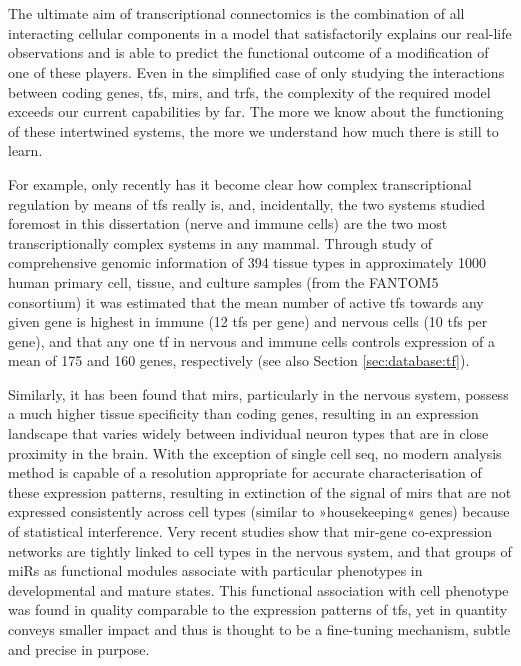 \section[Nested Multimodal Transcriptional Interactions - The Need for Connectomics]{}
The ultimate aim of transcriptional connectomics is the combination of all interacting cellular components in a model that satisfactorily explains our real-life observations and is able to predict the functional outcome of a modification of one of these players. Even in the simplified case of only studying the interactions between coding genes, \acp{tf}, \acp{mir}, and \acp{trf}, the complexity of the required model exceeds our current capabilities by far. The more we know about the functioning of these intertwined systems, the more we understand how much there is still to learn. 

For example, only recently has it become clear how complex transcriptional regulation by means of \acp{tf} really is, and, incidentally, the two systems studied foremost in this dissertation (nerve and immune cells) are the two most transcriptionally complex systems in any mammal. Through study of comprehensive genomic information of 394 tissue types in approximately 1000 human primary cell, tissue, and culture samples (from the FANTOM5 consortium) it was estimated that the mean number of active \acp{tf} towards any given gene is highest in immune (12 \acp{tf} per gene) and nervous cells (10 \acp{tf} per gene), and that any one \ac{tf} in nervous and immune cells controls expression of a mean of 175 and 160 genes, respectively\cite{Marbach2016} (see also Section \ref{sec:database:tf}). 

Similarly, it has been found that \acp{mir}, particularly in the nervous system, possess a much higher tissue specificity than coding genes, resulting in an expression landscape that varies widely between individual neuron types that are in close proximity in the brain. With the exception of single cell \ac{seq}, no modern analysis method is capable of a resolution appropriate for accurate characterisation of these expression patterns, resulting in extinction of the signal of \acp{mir} that are not expressed consistently across cell types (similar to »housekeeping« genes) because of statistical interference. Very recent studies show that \ac{mir}-gene co-expression networks are tightly linked to cell types in the nervous system, and that groups of miRs as functional modules associate with particular phenotypes in developmental and mature states\cite{Nowakowski2018}. This functional association with cell phenotype was found in quality comparable to the expression patterns of \acp{tf}, yet in quantity conveys smaller impact and thus is thought to be a fine-tuning mechanism, subtle and precise in purpose. 

